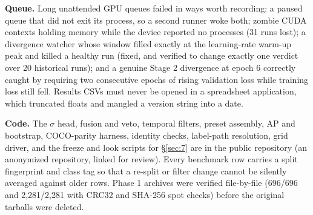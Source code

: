 \documentclass[10pt]{article}
\begin{document}
\textbf{Queue.} Long unattended GPU queues failed in ways worth recording: a paused queue that did not exit its process, so a second runner woke both; zombie CUDA contexts holding memory while the device reported no processes (31 runs lost); a divergence watcher whose window filled exactly at the learning-rate warm-up peak and killed a healthy run (fixed, and verified to change exactly one verdict over 20 historical runs); and a genuine Stage 2 divergence at epoch 6 correctly caught by requiring two consecutive epochs of rising validation loss while training loss still fell. Results CSVs must never be opened in a spreadsheet application, which truncated floats and mangled a version string into a date.

\textbf{Code.} The $\sigma$ head, fusion and veto, temporal filters, preset assembly, AP and bootstrap, COCO-parity harness, identity checks, label-path resolution, grid driver, and the freeze and look scripts for \S\ref{sec:7} are in the public repository (an anonymized repository, linked for review). Every benchmark row carries a split fingerprint and class tag so that a re-split or filter change cannot be silently averaged against older rows. Phase 1 archives were verified file-by-file (696/696 and 2,281/2,281 with CRC32 and SHA-256 spot checks) before the original tarballs were deleted.
\end{document}
